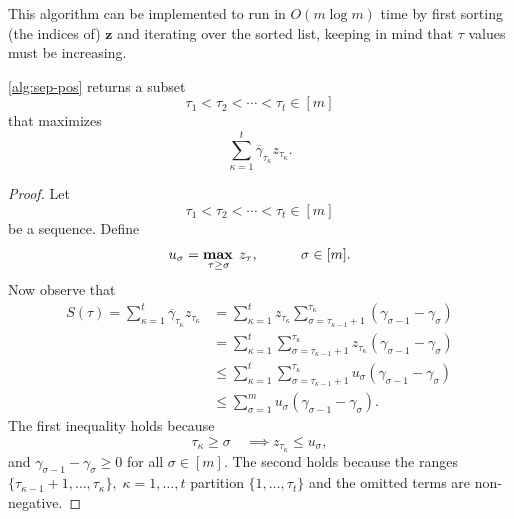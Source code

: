 This algorithm can be implemented to run in $O(m\log m)$ time by first sorting (the indices of) $\bm{z}$
and iterating over the sorted list, keeping in mind that $\tau$ values must be increasing.

\begin{theorem}\label{thm:sep-pos}
    \autoref{alg:sep-pos} returns a subset \[\tau_1 < \tau_2 < \cdots < \tau_t \in [m]\] that maximizes
    \[
        \sum_{\kappa = 1}^t \overline{\gamma}_{\tau_\kappa}z_{\tau_\kappa}.
    \]
\end{theorem}

\begin{proof}
    Let
    \[
        \tau_1 < \tau_2 < \cdots < \tau_t \in [m]
    \]
    be a sequence.
    Define
    \[
        u_{\sigma} = \mathop{\text{\textbf{max}}}\limits_{\,\tau \geq \sigma} \; z_{\tau}, \quad \quad \quad \sigma \in [m].
    \]
    Now observe that
    \begin{equation}\label{eq:sep-pos-proof-1}
        \begin{split}
            S(\tau) = \sum_{\kappa = 1}^t \overline{\gamma}_{\tau_\kappa}z_{\tau_\kappa}
            & = \sum_{\kappa = 1}^t z_{\tau_\kappa} \sum_{\sigma = \tau_{\kappa-1}+1}^{\tau_{\kappa}} (\gamma_{\sigma-1} - \gamma_{\sigma}) \\
            & = \sum_{\kappa = 1}^t \sum_{\sigma = \tau_{\kappa-1}+1}^{\tau_{\kappa}} z_{\tau_\kappa}(\gamma_{\sigma-1} - \gamma_{\sigma}) \\
            & \leq \sum_{\kappa = 1}^t \sum_{\sigma = \tau_{\kappa-1}+1}^{\tau_{\kappa}} u_{\sigma}(\gamma_{\sigma-1} - \gamma_{\sigma}) \\
            & \leq \sum_{\sigma = 1}^m u_{\sigma}(\gamma_{\sigma-1} - \gamma_\sigma).
        \end{split}
    \end{equation}
    The first inequality holds because
    \[
         \tau_\kappa \geq \sigma \quad \implies z_{\tau_\kappa} \leq u_\sigma,
    \]
    and $\gamma_{\sigma-1} - \gamma_\sigma \geq 0$ for all $\sigma \in [m]$.
    The second holds because the ranges $\{\tau_{\kappa-1}+1, \dots, \tau_\kappa\}, \; \kappa=1,\dots,t$
    partition $\{1, \dots, \tau_t\}$ and the omitted terms are non-negative.


\end{proof}
